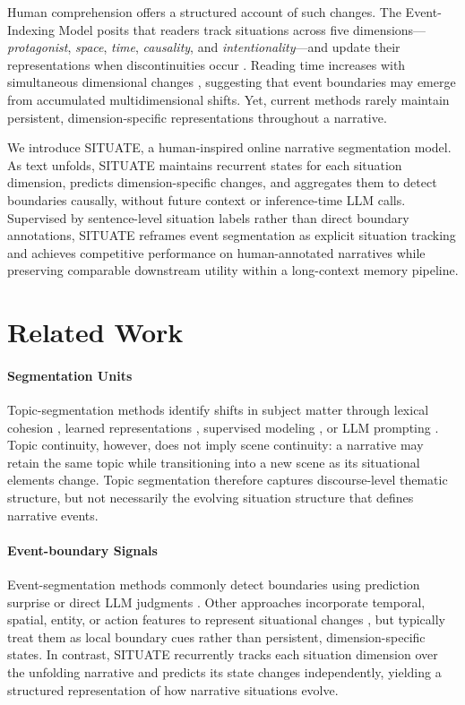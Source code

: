 \documentclass[11pt]{article}
\begin{document}
Human comprehension offers a structured account of such changes. The Event-Indexing Model posits that readers track situations across five dimensions---\textit{protagonist}, \textit{space}, \textit{time}, \textit{causality}, and \textit{intentionality}---and update their representations when discontinuities occur \citep{zwaan1995construction}. Reading time increases with simultaneous dimensional changes \citep{zwaan1998constructing}, suggesting that event boundaries may emerge from accumulated multidimensional shifts. Yet, current methods rarely maintain persistent, dimension-specific representations throughout a narrative.

We introduce SITUATE, a human-inspired online narrative segmentation model. As text unfolds, SITUATE maintains recurrent states for each situation dimension, predicts dimension-specific changes, and aggregates them to detect boundaries causally, without future context or inference-time LLM calls. Supervised by sentence-level situation labels rather than direct boundary annotations, SITUATE reframes event segmentation as explicit situation tracking and achieves competitive performance on human-annotated narratives while preserving comparable downstream utility within a long-context memory pipeline.


\section{Related Work}
\paragraph{Segmentation Units}
Topic-segmentation methods identify shifts in subject matter through lexical cohesion \citep{hearst1997text}, learned representations \citep{xing2021improving,gao2023unsupervised}, supervised modeling \citep{jiang2023superdialseg}, or LLM prompting \citep{artemiev2024leveraging,lee2025def}. Topic continuity, however, does not imply scene continuity: a narrative may retain the same topic while transitioning into a new scene as its situational elements change\citep{zehe2021detecting}. Topic segmentation therefore captures discourse-level thematic structure, but not necessarily the evolving situation structure that defines narrative events.

\paragraph{Event-boundary Signals}
Event-segmentation methods commonly detect boundaries using prediction surprise or direct LLM judgments \citep{kumar2023bayesian,fountas2025human,michelmann2025large,panela2025event,duarte2024lumberchunker}. Other approaches incorporate temporal, spatial, entity, or action features to represent situational changes \citep{barth2021participation,zehe2025assessing}, but typically treat them as local boundary cues rather than persistent, dimension-specific states. In contrast, SITUATE recurrently tracks each situation dimension over the unfolding narrative and predicts its state changes independently, yielding a structured representation of how narrative situations evolve.
\end{document}
